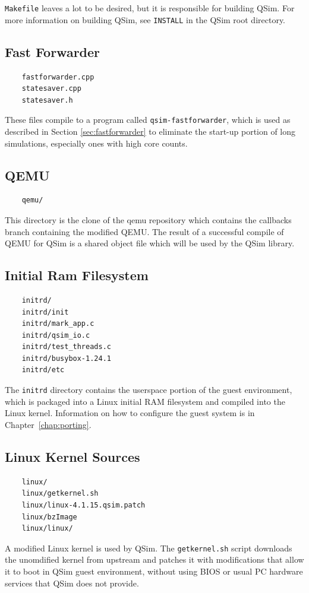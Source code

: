 \documentclass[letterpaper, 10pt]{book}
\begin{document}
\texttt{Makefile} leaves a lot to be desired, but it is responsible for
building QSim. For more information on building QSim, see \texttt{INSTALL} in
the QSim root directory. 

\subsection{Fast Forwarder}
\begin{verbatim}
    fastforwarder.cpp
    statesaver.cpp
    statesaver.h
\end{verbatim}
These files compile to a program called \texttt{qsim-fastforwarder}, which is 
used as described in Section \ref{sec:fastforwarder} to eliminate the start-up
portion of long simulations, especially ones with high core counts.

\subsection{QEMU}
\begin{verbatim}
    qemu/
\end{verbatim}
This directory is the clone of the qemu repository which contains the callbacks
branch containing the modified QEMU. The result of a successful compile of QEMU
for QSim is a shared object file which will be used by the QSim library.

\subsection{Initial Ram Filesystem}
\begin{verbatim}
    initrd/
    initrd/init
    initrd/mark_app.c
    initrd/qsim_io.c
    initrd/test_threads.c
    initrd/busybox-1.24.1
    initrd/etc
\end{verbatim}
The \texttt{initrd} directory contains the userspace portion of the guest
environment, which is packaged into a Linux initial RAM filesystem and compiled
into the Linux kernel. Information on how to configure the guest system is in
Chapter~\ref{chap:porting}.

\subsection{Linux Kernel Sources}
\begin{verbatim}
    linux/
    linux/getkernel.sh
    linux/linux-4.1.15.qsim.patch
    linux/bzImage
    linux/linux/
\end{verbatim}
A modified Linux kernel is used by QSim. The \texttt{getkernel.sh} script
downloads the unomdified kernel from upstream and patches it with modifications
that allow it to boot in QSim guest environment, without using BIOS or usual PC
hardware services that QSim does not provide.
\end{document}
